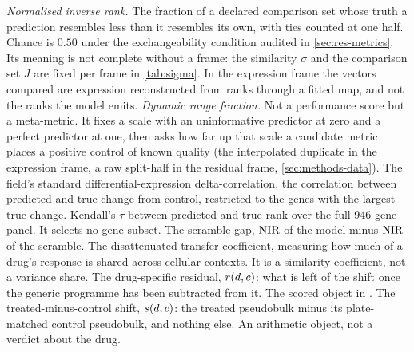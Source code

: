 \begin{description}[labelwidth=5em, leftmargin=6em, labelsep=0.6em,
                    style=multiline, font=\normalfont, itemsep=0.5ex]
 \emph{Normalised inverse rank.} The fraction of a declared
  comparison set whose truth a prediction resembles less than it resembles its
  own, with ties counted at one half. Chance is $0.50$ under the exchangeability
  condition audited in \cref{sec:res-metrics}. Its meaning is not complete
  without a frame: the similarity $\sigma$ and the comparison set $J$ are fixed
  per frame in \cref{tab:sigma}. In the expression frame the vectors compared
  are expression reconstructed from ranks through a fitted map, and not the
  ranks the model emits.
 \emph{Dynamic range fraction.} Not a performance score but
  a meta-metric. It fixes a scale with an uninformative predictor at zero and a
  perfect predictor at one, then asks how far up that scale a candidate metric
  places a positive control of known quality (the interpolated duplicate in the
  expression frame, a raw split-half in the residual frame,
  \cref{sec:methods-data}).
 The field's standard differential-expres\-sion
  delta-cor\-re\-la\-tion, the correlation between predicted and true change
  from control, restricted to the genes with the largest true change.
 Kendall's $\tau$ between predicted and true rank
  over the full $946$-gene panel. It selects no gene subset.
 The scramble gap, $\textrm{NIR}$ of the model minus $\textrm{NIR}$ of the
  scramble.
 The disattenuated transfer coefficient, measuring how
  much of a drug's response is shared across cellular contexts. It is a
  similarity coefficient, not a variance share.
 The drug-specific residual, $r(d,c)$: what is
  left of the shift once the generic programme has been subtracted from it. The
  scored object in \Rframe.
 The treated-minus-control shift, $s(d,c)$: the
  treated pseudobulk minus its plate-matched control pseudobulk, and nothing
  else. An arithmetic object, not a verdict about the drug.

\end{description}
